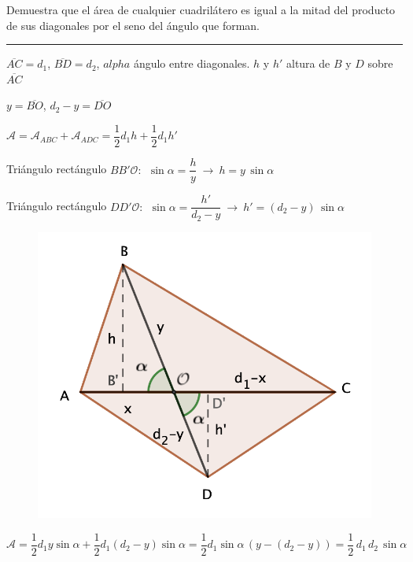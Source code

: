 \begin{miejercicio}

Demuestra que el área de cualquier cuadrilátero es igual a la mitad del producto de sus diagonales por el seno del ángulo que forman.

\rule{250pt}{0.1pt}

\begin{multicols}{2}

$\overline{AC}=d_1$, $\overline{BD}=d_2$, $alpha$ ángulo entre diagonales. $h$ y $h'$ altura de $B$ y $D$ sobre $\overline{AC}$

$y=\overline{BO}$, $d_2-y=\overline{DO}$

$\mathcal A=\mathcal A_{ABC}+\mathcal A_{ADC}=\dfrac 1 2 d_1 h + \dfrac 1 2 d_1 h'$

\vspace{2mm} Triángulo rectángulo $BB'\mathcal O:\ \ \sin \alpha=\dfrac h y \ \to \ h=y\, \sin \alpha$

\vspace{2mm} Triángulo rectángulo $DD'\mathcal O:\ \ \sin \alpha=\dfrac {h'}{d_2-y} \ \to \ h'=(d_2-y)\, \sin \alpha$

\begin{figure}[H]
	\centering
	\includegraphics[width=.5\textwidth]{img-triang/triang23.png}
\end{figure}
	
\end{multicols}


$\mathcal A= \dfrac 1 2 d_1 y \sin \alpha + \dfrac 1 2 d_1 (d_2-y) \sin \alpha= \dfrac 1 2 d_1 \sin \alpha \, (y-(d_2-y))= \dfrac 1 2 \, d_1 \, d_2 \, \sin \alpha $ \QED
	
\end{miejercicio}



